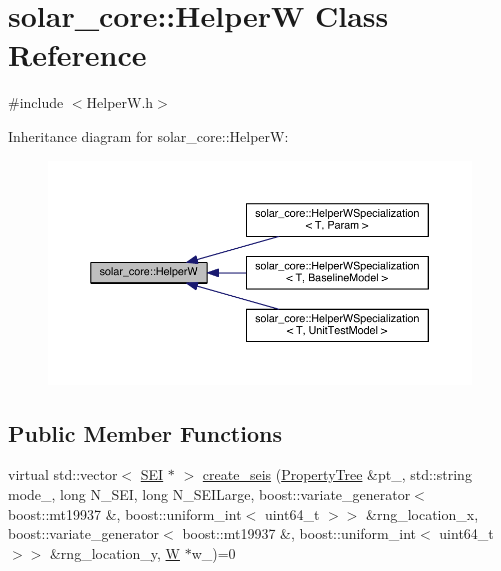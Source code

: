 \hypertarget{classsolar__core_1_1_helper_w}{}\section{solar\+\_\+core\+:\+:Helper\+W Class Reference}
\label{classsolar__core_1_1_helper_w}


{\ttfamily \#include $<$Helper\+W.\+h$>$}



Inheritance diagram for solar\+\_\+core\+:\+:Helper\+W\+:\nopagebreak
\begin{figure}[H]
\begin{center}
\leavevmode
\includegraphics[width=350pt]{classsolar__core_1_1_helper_w__inherit__graph}
\end{center}
\end{figure}
\subsection*{Public Member Functions}
\begin{DoxyCompactItemize}
\item 
virtual std\+::vector$<$ \hyperlink{classsolar__core_1_1_s_e_i}{S\+E\+I} $\ast$ $>$ \hyperlink{classsolar__core_1_1_helper_w_a2d53e9a0f5945ced5ddc0388278d2336}{create\+\_\+seis} (\hyperlink{namespacesolar__core_adeda2737d6938c190eb774a5b2495045}{Property\+Tree} \&pt\+\_\+, std\+::string mode\+\_\+, long N\+\_\+\+S\+E\+I, long N\+\_\+\+S\+E\+I\+Large, boost\+::variate\+\_\+generator$<$ boost\+::mt19937 \&, boost\+::uniform\+\_\+int$<$ uint64\+\_\+t $>$$>$ \&rng\+\_\+location\+\_\+x, boost\+::variate\+\_\+generator$<$ boost\+::mt19937 \&, boost\+::uniform\+\_\+int$<$ uint64\+\_\+t $>$$>$ \&rng\+\_\+location\+\_\+y, \hyperlink{classsolar__core_1_1_w}{W} $\ast$w\+\_\+)=0
\end{DoxyCompactItemize}


